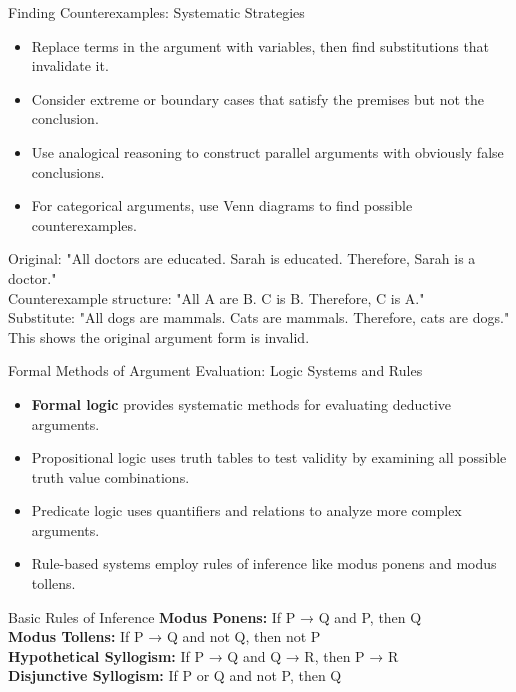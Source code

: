 \documentclass{beamer}
\begin{document}
\begin{frame}{Finding Counterexamples: Systematic Strategies}
    \begin{itemize}
        \item Replace terms in the argument with variables, then find substitutions that invalidate it.
        \item Consider extreme or boundary cases that satisfy the premises but not the conclusion.
        \item Use analogical reasoning to construct parallel arguments with obviously false conclusions.
        \item For categorical arguments, use Venn diagrams to find possible counterexamples.
    \end{itemize}
    
    \begin{example}
        Original: "All doctors are educated. Sarah is educated. Therefore, Sarah is a doctor."\\
        
        Counterexample structure: "All A are B. C is B. Therefore, C is A."\\
        
        Substitute: "All dogs are mammals. Cats are mammals. Therefore, cats are dogs."\\
        
        This shows the original argument form is invalid.
    \end{example}
\end{frame}

\begin{frame}{Formal Methods of Argument Evaluation: Logic Systems and Rules}
    \begin{itemize}
        \item \textbf{Formal logic} provides systematic methods for evaluating deductive arguments.
        \item Propositional logic uses truth tables to test validity by examining all possible truth value combinations.
        \item Predicate logic uses quantifiers and relations to analyze more complex arguments.
        \item Rule-based systems employ rules of inference like modus ponens and modus tollens.
    \end{itemize}
    
    \begin{block}{Basic Rules of Inference}
        \textbf{Modus Ponens:} If P → Q and P, then Q\\
        \textbf{Modus Tollens:} If P → Q and not Q, then not P\\
        \textbf{Hypothetical Syllogism:} If P → Q and Q → R, then P → R\\
        \textbf{Disjunctive Syllogism:} If P or Q and not P, then Q
    \end{block}
\end{frame}
\end{document}
